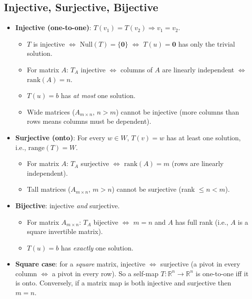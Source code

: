 \documentclass[hidelinks]{article}
\begin{document}
\subsection{Injective, Surjective, Bijective}
\begin{itemize}
    \item \textbf{Injective (one-to-one)}: $T(v_1)=T(v_2) \Longrightarrow v_1=v_2$.
    \begin{itemize}
        \item $T$ is injective $\iff$ $\mathrm{Null}(T)=\{\mathbf{0}\}$ $\iff$ $T(u)=\mathbf{0}$ has only the trivial solution.
        \item For matrix $A$: $T_A$ injective $\iff$ columns of $A$ are linearly independent $\iff$ $\mathrm{rank}(A) = n$.
        \item $T(u)=b$ has \emph{at most} one solution.
        \item Wide matrices ($A_{m\times n}$, $n > m$) cannot be injective (more columns than rows means columns must be dependent).
    \end{itemize}
    \item \textbf{Surjective (onto)}: For every $w\in W$, $T(v)=w$ has at least one solution, i.e., $\mathrm{range}(T) = W$.
    \begin{itemize}
        \item For matrix $A$: $T_A$ surjective $\iff$ $\mathrm{rank}(A) = m$ (rows are linearly independent).
        \item Tall matrices ($A_{m\times n}$, $m > n$) cannot be surjective (rank $\leq n < m$).
    \end{itemize}
    \item \textbf{Bijective}: injective \emph{and} surjective.
    \begin{itemize}
        \item For matrix $A_{m\times n}$: $T_A$ bijective $\iff$ $m = n$ and $A$ has full rank (i.e., $A$ is a square invertible matrix).
        \item $T(u)=b$ has \emph{exactly} one solution.
    \end{itemize}
    \item \textbf{Square case}: for a \emph{square} matrix, injective $\iff$ surjective (a pivot in every column $\iff$ a pivot in every row). So a self-map $T:\mathbb{R}^n\to\mathbb{R}^n$ is one-to-one iff it is onto. Conversely, if a matrix map is both injective and surjective then $m=n$.
\end{itemize}

\end{document}
